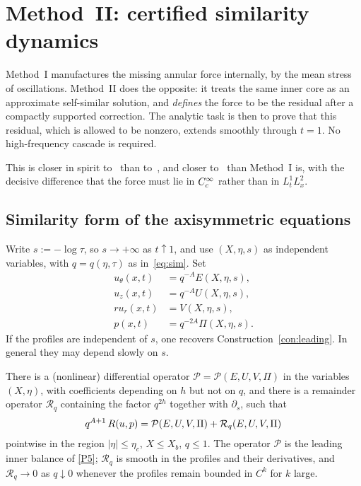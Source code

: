 \section{Method~II: certified similarity dynamics}
\label{sec:methodII}

Method~I manufactures the missing annular force internally, by the mean stress of oscillations. Method~II does the opposite: it treats the same inner core as an approximate self-similar solution, and \emph{defines} the force to be the residual after a compactly supported correction. The analytic task is then to prove that this residual, which is allowed to be nonzero, extends smoothly through $t=1$. No high-frequency cascade is required.

This is closer in spirit to~\cite{chenhou2022,anandkumar2026} than to~\cite{cmz2023}, and closer to~\cite{abc2022} than Method~I is, with the decisive difference that the force must lie in $C_c^\infty$ rather than in $L^1_t L^2_x$.

\subsection{Similarity form of the axisymmetric equations}
\label{sec:sim-NS}

Write $s:=-\log\tau$, so $s\to+\infty$ as $t\uparrow 1$, and use $(X,\eta,s)$ as independent variables, with $q=q(\eta,\tau)$ as in~\eqref{eq:sim}. Set
\begin{equation}
\label{eq:self-field}
\begin{aligned}
u_\theta(x,t)&=q^{-A} E(X,\eta,s),\\
u_z(x,t)&=q^{-A} U(X,\eta,s),\\
r u_r(x,t)&=V(X,\eta,s),\\
p(x,t)&=q^{-2A}\Pi(X,\eta,s).
\end{aligned}
\end{equation}
If the profiles are independent of $s$, one recovers Construction~\ref{con:leading}. In general they may depend slowly on $s$.

\begin{lemma}
\label{lem:rescaled-op}
There is a (nonlinear) differential operator $\mathcal P=\mathcal P(E,U,V,\Pi)$ in the variables $(X,\eta)$, with coefficients depending on $h$ but not on $q$, and there is a remainder operator $\mathcal R_q$ containing the factor $q^{2h}$ together with $\partial_s$, such that
\begin{equation}
\label{eq:rescaled-op}
q^{A+1}\,R(u,p)
=\mathcal P(E,U,V,\Pi)
+\mathcal R_q(E,U,V,\Pi)
\end{equation}
pointwise in the region $|\eta|\le\eta_c$, $X\le X_b$, $q\le 1$. The operator $\mathcal P$ is the leading inner balance of \ref{P5}; $\mathcal R_q$ is smooth in the profiles and their derivatives, and $\mathcal R_q\to 0$ as $q\downarrow 0$ whenever the profiles remain bounded in $C^k$ for $k$ large.
\end{lemma}

